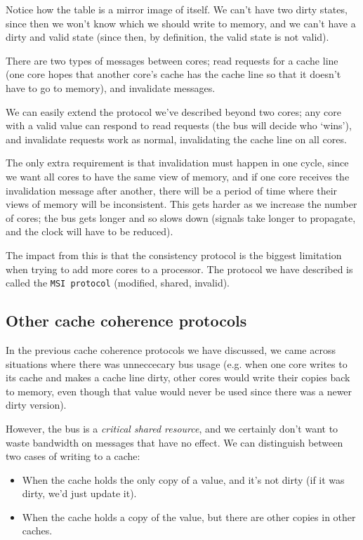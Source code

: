 Notice how the table is a mirror image of itself. We can't have two dirty
states, since then we won't know which we should write to memory, and we can't
have a dirty and valid state (since then, by definition, the valid state is not
valid).



There are two types of messages between cores; read requests for a cache line
(one core hopes that another core's cache has the cache line so that it doesn't
have to go to memory), and invalidate messages.

We can easily extend the protocol we've described beyond two cores; any core
with a valid value can respond to read requests (the bus will decide who
`wins'), and invalidate requests work as normal, invalidating the cache line on
all cores.

The only extra requirement is that invalidation must happen in one cycle, since
we want all cores to have the same view of memory, and if one core receives the
invalidation message after another, there will be a period of time where their
views of memory will be inconsistent. This gets harder as we increase the number
of cores; the bus gets longer and so slows down (signals take longer to
propagate, and the clock will have to be reduced).

The impact from this is that the consistency protocol is the biggest limitation
when trying to add more cores to a processor. The protocol we have described is
called the \texttt{MSI protocol} (modified, shared, invalid).

\subsection{Other cache coherence protocols}

In the previous cache coherence protocols we have discussed, we came across
situations where there was unneccecary bus usage (e.g. when one core writes to
its cache and makes a cache line dirty, other cores would write their copies
back to memory, even though that value would never be used since there was a
newer dirty version).

However, the bus is a \textit{critical shared resource}, and we certainly don't
want to waste bandwidth on messages that have no effect. We can distinguish
between two cases of writing to a cache:

\begin{itemize}
  \item When the cache holds the only copy of a value, and it's not dirty (if it
  was dirty, we'd just update it).
  \item When the cache holds a copy of the value, but there are other copies in
  other caches.
\end{itemize}

